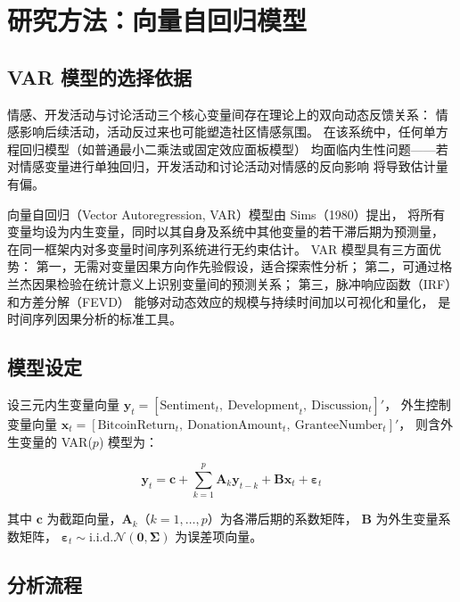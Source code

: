 \documentclass[
    type = master, %
    degree = professional,        %
    decl-page,  %
    twoside,                %
    fontset = fandol %
  ]{njuthesis}
\begin{document}
\section{研究方法：向量自回归模型}

\subsection{VAR 模型的选择依据}

情感、开发活动与讨论活动三个核心变量间存在理论上的双向动态反馈关系：
情感影响后续活动，活动反过来也可能塑造社区情感氛围。
在该系统中，任何单方程回归模型（如普通最小二乘法或固定效应面板模型）
均面临内生性问题——若对情感变量进行单独回归，开发活动和讨论活动对情感的反向影响
将导致估计量有偏。

向量自回归（Vector Autoregression, VAR）模型由 Sims（1980）\cite{sims1980macroeconomics}提出，
将所有变量均设为内生变量，同时以其自身及系统中其他变量的若干滞后期为预测量，
在同一框架内对多变量时间序列系统进行无约束估计。
VAR 模型具有三方面优势：
第一，无需对变量因果方向作先验假设，适合探索性分析；
第二，可通过格兰杰因果检验\cite{granger1969investigating}在统计意义上识别变量间的预测关系；
第三，脉冲响应函数（IRF）和方差分解（FEVD）
能够对动态效应的规模与持续时间加以可视化和量化，
是时间序列因果分析的标准工具。

\subsection{模型设定}

设三元内生变量向量
$\mathbf{y}_t = [\text{Sentiment}_t,\ \text{Development}_t,\ \text{Discussion}_t]'$，
外生控制变量向量
$\mathbf{x}_t = [\text{BitcoinReturn}_t,\ \text{DonationAmount}_t,\ \text{GranteeNumber}_t]'$，
则含外生变量的 VAR($p$) 模型为：

\begin{equation}
\label{eq:var-model}
\mathbf{y}_t = \mathbf{c} + \sum_{k=1}^{p} \mathbf{A}_k \mathbf{y}_{t-k}
+ \mathbf{B} \mathbf{x}_t + \boldsymbol{\varepsilon}_t
\end{equation}

其中 $\mathbf{c}$ 为截距向量，$\mathbf{A}_k$（$k=1,\ldots,p$）为各滞后期的系数矩阵，
$\mathbf{B}$ 为外生变量系数矩阵，
$\boldsymbol{\varepsilon}_t \sim \text{i.i.d.} \mathcal{N}(\mathbf{0}, \boldsymbol{\Sigma})$
为误差项向量。

\subsection{分析流程}
\end{document}
